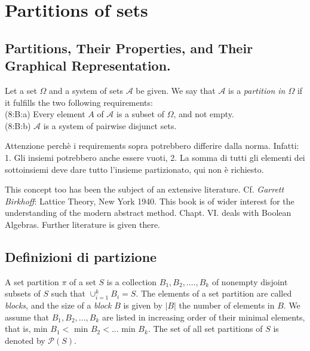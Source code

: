 \chapter{Partitions of sets}

\section{Partitions, Their Properties, and Their Graphical Representation. \cite{vonNeumann1944}}
Let a set $\Omega$ and a system of sets $\mathcal{A}$ be given. We say that $\mathcal{A}$ is a \emph{partition in $\Omega$} if it fulfills the two following requirements:\\

\medskip
(8:B:a) Every element $A$ of $\mathcal{A}$ is a subset of $\Omega$, and not empty.\\

(8:B:b) $\mathcal{A}$ is a system of pairwise disjunct sets.\\
\medskip

Attenzione perch\`e i requirements sopra potrebbero differire dalla norma. Infatti: 1. Gli insiemi potrebbero anche essere vuoti, 2. La somma di tutti gli elementi dei sottoinsiemi deve dare tutto l'insieme partizionato, qui non \`e richiesto.

This concept too has been the subject of an extensive literature. Cf. \emph{Garrett Birkhoff}: Lattice Theory, New York 1940. This book is of wider interest for the understanding of the modern abstract method. Chapt. VI. deals with Boolean Algebras. Further literature is given there.

\section{Definizioni di partizione}

\begin{definizione}
	A set partition $\pi$ of a set $S$ is a collection $B_1, B_2, ...., B_k$ of nonempty disjoint subsets of $S$ such that $\cup_{i=1}^k B_i = S$. The elements of a set partition are called \emph{blocks}, and the size of a \emph{block} $B$ is given by $|B|$ the number of elements in $B$. We assume that $B_1, B_2, ..., B_k$ are listed in increasing order of their minimal elements, that is, min $B_1 <$ min $B_2 < ... $ min $B_k$. The set of all set partitions of $S$ is denoted by $\mathcal{P}(S)$. \cite{mansour01}
\end{definizione}